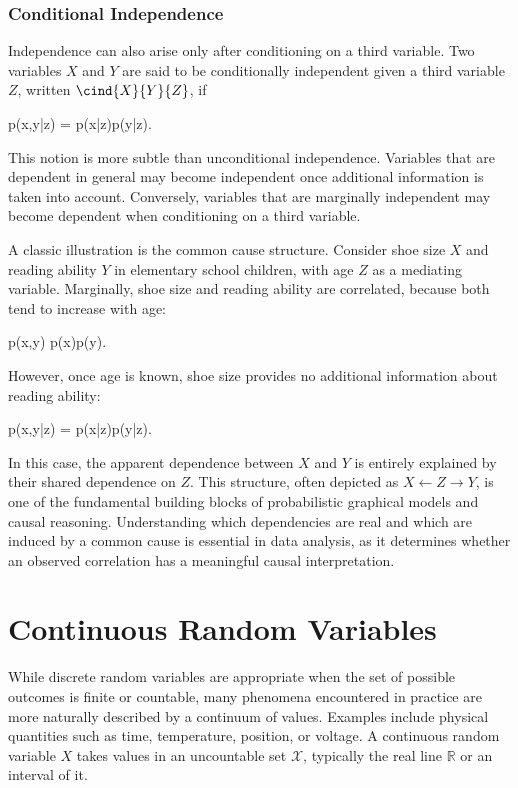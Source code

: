 \subsubsection*{Conditional Independence}

Independence can also arise only after conditioning on a third variable. Two variables $X$ and $Y$ are said to be \alert{conditionally independent} given a third variable $Z$, written $\cind{X}{Y}{Z}$, if
\begin{myequation}
p(x,y|z) = p(x|z)p(y|z).
\end{myequation}
This notion is more subtle than unconditional independence. Variables that are dependent in general may become independent once additional information is taken into account. Conversely, variables that are marginally independent may become dependent when conditioning on a third variable.

A classic illustration is the \alert{common cause} structure. Consider shoe size $X$ and reading ability $Y$ in elementary school children, with age $Z$ as a mediating variable. Marginally, shoe size and reading ability are correlated, because both tend to increase with age:
\begin{myequation}
p(x,y) \neq p(x)p(y).
\end{myequation}
However, once age is known, shoe size provides no additional information about reading ability:
\begin{myequation}
p(x,y|z) = p(x|z)p(y|z).
\end{myequation}
In this case, the apparent dependence between $X$ and $Y$ is entirely explained by their shared dependence on $Z$. This structure, often depicted as $X \leftarrow Z \rightarrow Y$, is one of the fundamental building blocks of probabilistic graphical models and causal reasoning. Understanding which dependencies are real and which are induced by a common cause is essential in data analysis, as it determines whether an observed correlation has a meaningful causal interpretation.


\section*{Continuous Random Variables}

While discrete random variables are appropriate when the set of possible outcomes is finite or countable, many phenomena encountered in practice are more naturally described by a continuum of values. Examples include physical quantities such as time, temperature, position, or voltage. A \alert{continuous random variable} $X$ takes values in an uncountable set $\mathcal{X}$, typically the real line $\mathbb{R}$ or an interval of it.

